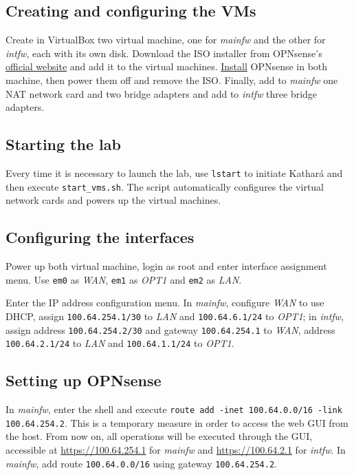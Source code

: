 \documentclass[draft]{homework}
\newcommand{\kat}{Kathará\xspace}
\newcommand{\opn}{OPNsense\xspace}
\newcommand{\vb}{VirtualBox\xspace}
\newcommand{\intfw}{\textit{intfw}\xspace}
\newcommand{\mainfw}{\textit{mainfw}\xspace}
\newcommand{\lan}{\textit{LAN}\xspace}
\newcommand{\opt}{\textit{OPT1}\xspace}
\newcommand{\wan}{\textit{WAN}\xspace}
\begin{document}
    \subsection{Creating and configuring the VMs}
    Create in \vb two virtual machine, one for \mainfw and the other for \intfw, each with its own disk. Download the ISO installer from \opn's \href{https://opnsense.org/download/}{official website} and add it to the virtual machines. \href{https://docs.opnsense.org/manual/install.html}{Install} \opn in both machine, then power them off and remove the ISO.
    Finally, add to \mainfw one NAT network card and two bridge adapters and add to \intfw three bridge adapters.
    
    \subsection{Starting the lab}
    Every time it is necessary to launch the lab, use \texttt{lstart} to initiate \kat and then execute \texttt{start\_vms.sh}.
    The script automatically configures the virtual network cards and powers up the virtual machines. 
    
    \subsection{Configuring the interfaces}
    Power up both virtual machine, login as root and enter interface assignment menu. Use \texttt{em0} as \wan, \texttt{em1} as \opt and \texttt{em2} as \lan.
    
    Enter the IP address configuration menu. In \mainfw, configure \wan to use DHCP, assign \texttt{100.64.254.1/30} to \lan and \texttt{100.64.6.1/24} to \opt; in \intfw, assign address \texttt{100.64.254.2/30} and gateway \texttt{100.64.254.1} to \wan, address \texttt{100.64.2.1/24} to \lan and \texttt{100.64.1.1/24} to \opt.
    
    \subsection{Setting up \opn}
    In \mainfw, enter the shell and execute \texttt{route add -inet 100.64.0.0/16 -link \\ 100.64.254.2}. This is a temporary measure in order to access the web GUI from the host. From now on, all operations will be executed through the GUI, accessible at \url{https://100.64.254.1} for \mainfw and \url{https://100.64.2.1} for \intfw. In \mainfw, add route \texttt{100.64.0.0/16} using gateway \texttt{100.64.254.2}.
    
\end{document}

